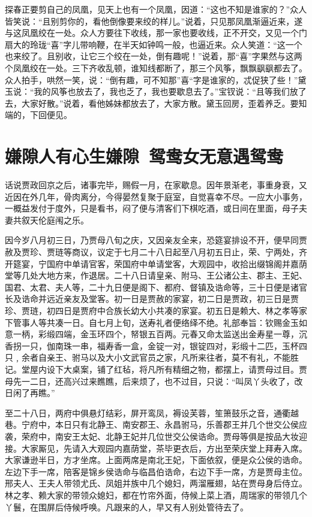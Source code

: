 \documentclass[12pt,oneside]{book}
\begin{document}
探春正要剪自己的凤凰，见天上也有一个凤凰，因道：“这也不知是谁家的？”众人皆笑说：“且别剪你的，看他倒像要来绞的样儿。”说着，只见那凤凰渐逼近来，遂与这凤凰绞在一处。众人方要往下收线，那一家也要收线，正不开交，又见一个门扇大的玲珑“喜”字儿带响鞭，在半天如钟鸣一般，也逼近来。众人笑道：“这一个也来绞了。且别收，让它三个绞在一处，倒有趣呢！”说着，那“喜”字果然与这两个凤凰绞在一处。三下齐收乱顿，谁知线都断了，那三个风筝，飘飘飖飖都去了。众人拍手，哄然一笑，说：“倒有趣，可不知那”喜“字是谁家的，忒促狭了些！”黛玉说：“我的风筝也放去了，我也乏了，我也要歇息去了。”宝钗说：“且等我们放了去，大家好散。”说着，看他姊妹都放去了，大家方散。黛玉回房，歪着养乏。要知端的，下回便见。



\chapter{嫌隙人有心生嫌隙~鸳鸯女无意遇鸳鸯}
话说贾政回京之后，诸事完毕，赐假一月，在家歇息。因年景渐老，事重身衰，又近因在外几年，骨肉离分，今得晏然复聚于庭室，自觉喜幸不尽。一应大小事务，一概益发付于度外，只是看书，闷了便与清客们下棋吃酒，或日间在里面，母子夫妻共叙天伦庭闱之乐。

因今岁八月初三日，乃贾母八旬之庆，又因亲友全来，恐筵宴排设不开，便早同贾赦及贾珍、贾琏等商议，议定于七月二十八日起至八月初五日止，荣、宁两处，齐开筵宴，宁国府中单请官客，荣国府中单请堂客，大观园中，收拾出缀锦阁并嘉荫堂等几处大地方来，作退居。二十八日请皇亲、附马、王公诸公主、郡主、王妃、国君、太君、夫人等，二十九日便是阁下、都府、督镇及诰命等，三十日便是诸官长及诰命并远近亲友及堂客。初一日是贾赦的家宴，初二日是贾政，初三日是贾珍、贾琏，初四日是贾府中合族长幼大小共凑的家宴。初五日是赖大、林之孝等家下管事人等共凑一日。自七月上旬，送寿礼者便络绎不绝。礼部奉旨：钦赐金玉如意一柄，彩缎四端，金玉环四个，帑银五百两。元春又命太监送出金寿星一尊，沉香拐一只，伽南珠一串，福寿香一盒，金锭一对，银锭四对，彩缎十二匹，玉杯四只﹐余者自亲王、驸马以及大小文武官员之家，凡所来往者，莫不有礼，不能胜记。堂屋内设下大桌案，铺了红毡，将凡所有精细之物，都摆上，请贾母过目。贾母先一二日，还高兴过来瞧瞧，后来烦了，也不过目，只说：“叫凤丫头收了，改日闲了再瞧。”

至二十八日，两府中俱悬灯结彩，屏开鸾凤，褥设芙蓉，笙箫鼓乐之音，通衢越巷。宁府中，本日只有北静王、南安郡王、永昌驸马，乐善郡王并几个世交公侯应袭，荣府中，南安王太妃、北静王妃并几位世交公侯诰命。贾母等俱是按品大妆迎接。大家厮见，先请入大观园内嘉荫堂，茶毕更衣后，方出至荣庆堂上拜寿入席。大家谦逊半日，方才坐席。上面两席是南北王妃，下面依叙，便是众公侯的诰命。左边下手一席，陪客是锦乡侯诰命与临昌伯诰命，右边下手一席，方是贾母主位。邢夫人、王夫人带领尤氏、凤姐并族中几个媳妇，两溜雁翅，站在贾母身后侍立。林之孝、赖大家的带领众媳妇，都在竹帘外面，侍候上菜上酒，周瑞家的带领几个丫鬟，在围屏后侍候呼唤。凡跟来的人，早又有人别处管待去了。
\end{document}

